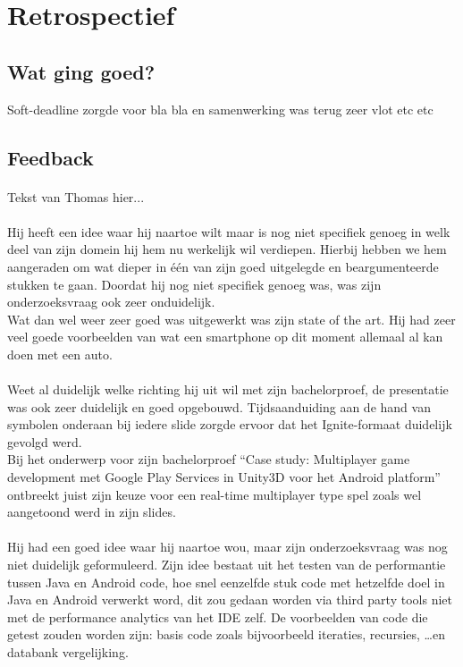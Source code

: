 \documentclass[fleqn,10pt]{voorstel}
\begin{document}
\section{Retrospectief}
\subsection{Wat ging goed?}
Soft-deadline zorgde voor bla bla en samenwerking was terug zeer vlot etc etc

\subsection{Feedback}

\paragraph{\cite{VanSevenant2016}}
Tekst van Thomas hier...

\paragraph{\cite{Willems2016}}
Hij heeft een idee waar hij naartoe wilt maar is nog niet specifiek genoeg in welk deel van zijn domein hij hem nu werkelijk wil verdiepen. Hierbij hebben we hem aangeraden om wat dieper in één van zijn goed uitgelegde en beargumenteerde stukken te gaan. Doordat hij nog niet specifiek genoeg was, was zijn onderzoeksvraag ook zeer onduidelijk.\\
Wat dan wel weer zeer goed was uitgewerkt was zijn state of the art. Hij had zeer veel goede voorbeelden van wat een smartphone op dit moment allemaal al kan doen met een auto.

\paragraph{\cite{Pinsard2016}}
Weet al duidelijk welke richting hij uit wil met zijn bachelorproef, de presentatie was ook zeer duidelijk en goed opgebouwd. Tijdsaanduiding aan de hand van symbolen onderaan bij iedere slide zorgde ervoor dat het Ignite-formaat duidelijk gevolgd werd.\\
Bij het onderwerp voor zijn bachelorproef “Case study: Multiplayer game development met Google Play Services in Unity3D voor het Android platform” ontbreekt juist zijn keuze voor een real-time multiplayer type spel zoals wel aangetoond werd in zijn slides.

\paragraph{\cite{DeCroock2016}}
Hij had een goed idee waar hij naartoe wou, maar zijn onderzoeksvraag was nog niet duidelijk geformuleerd. 
Zijn idee bestaat uit het testen van de performantie tussen Java en Android code, hoe snel eenzelfde stuk code met hetzelfde doel in Java en Android verwerkt word, dit zou gedaan worden via third party tools niet met de performance analytics van het IDE zelf. De voorbeelden van code die getest zouden worden zijn: basis code zoals bijvoorbeeld iteraties, recursies, \dots en databank vergelijking.
\end{document}
